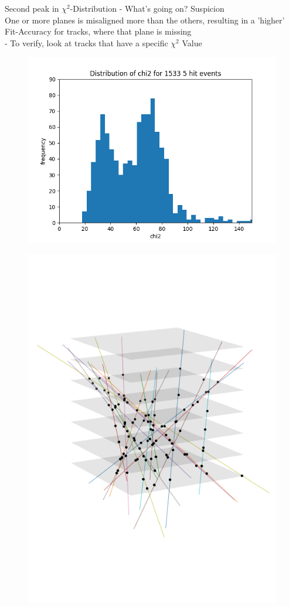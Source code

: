 \documentclass{beamer}
\begin{document}
\begin{frame}{Second peak in \texorpdfstring{\( \chi ^2 \)}{}-Distribution
- What's going on?}
\LARGE Suspicion \\
\normalsize One or more planes is misaligned more than the others, resulting
in a 'higher' Fit-Accuracy for tracks, where that plane is missing \\[.5cm]
- To verify, look at tracks that have a specific \( \chi ^2 \) Value
\begin{minipage}{.3\textwidth}
    \begin{figure}[H]
	\centering
	\includegraphics[trim=80 0 160 50,clip,width=\textwidth]{567.png}
    \end{figure}
\end{minipage}
\begin{minipage}{.49\textwidth}
    \begin{figure}[H]
	\centering
	\includegraphics[width=.7\textwidth]{chi2_many_75.png}

\end{figure}
\end{minipage}
\end{frame}
\end{document}
